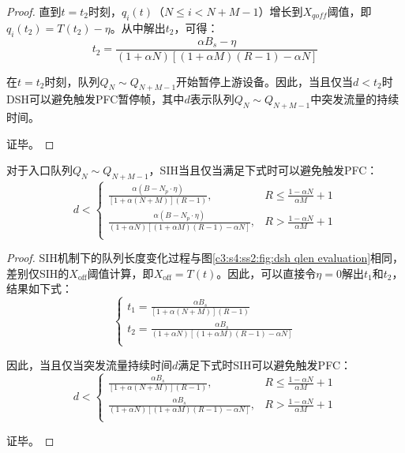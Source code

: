 \begin{proof}
  直到$t=t_2$时刻，$q_i(t)$（$N \leqslant i < N + M - 1$）增长到$X_{\mathit{qoff}}$阈值，即$q_i(t_2)=T(t_2)-\eta$。从中解出$t_2$，可得：
  \begin{equation}
    t_2=\frac{\alpha B_s - \eta}{(1+\alpha N)[(1+\alpha M)(R-1)-\alpha N]}
  \end{equation}

  在$t=t_2$时刻，队列$Q_N \sim Q_{N+M-1}$开始暂停上游设备。因此，当且仅当$d<t_2$时DSH可以避免触发PFC暂停帧，其中$d$表示队列$Q_N \sim Q_{N+M-1}$中突发流量的持续时间。

  证毕。
\end{proof}


\begin{theorem}
  对于入口队列$Q_N \sim Q_{N+M-1}$，SIH当且仅当满足下式时可以避免触发PFC：
  \label{thm:c3:burst absorption for SIH}  
  \begin{equation}
    d < 
    \begin{cases}
      \frac{\alpha(B-N_p\cdot \eta)}{[1+\alpha(N+M)](R-1)}, & R\leqslant\frac{1-\alpha N}{\alpha M}+1 \\
      \frac{\alpha(B-N_p\cdot \eta)}{(1+\alpha N)[(1+\alpha M)(R-1)-\alpha N]}, & R>\frac{1-\alpha N}{\alpha M}+1 \\
    \end{cases}
    \label{eqn:c3:sih burst obsorption}
  \end{equation}
  
\end{theorem}

\begin{proof}
  SIH机制下的队列长度变化过程与图\ref{c3:s4:ss2:fig:dsh qlen evaluation}相同，差别仅SIH的$X_{\text{off}}$阈值计算，即$X_{\text{off}} = T(t)$。因此，可以直接令$\eta = 0$解出$t_1$和$t_2$，结果如下式：
  \begin{equation}
    \begin{cases}
      t_1=\frac{\alpha B_s}{[1+\alpha (N+M)](R-1)} \\
      t_2=\frac{\alpha B_s}{(1+\alpha N)[(1+\alpha M)(R-1)-\alpha N]} \\
    \end{cases}  
    \label{c3:s4:ss2:eqn:t1 and t2 in sih}
  \end{equation}

  因此，当且仅当突发流量持续时间$d$满足下式时SIH可以避免触发PFC：
  \begin{equation}
    d < 
    \begin{cases}
      \frac{\alpha B_s}{[1+\alpha(N+M)](R-1)}, & R\leqslant\frac{1-\alpha N}{\alpha M}+1 \\
      \frac{\alpha B_s}{(1+\alpha N)[(1+\alpha M)(R-1)-\alpha N]}, & R>\frac{1-\alpha N}{\alpha M}+1 \\
    \end{cases}
    \label{eqn:c3:sih:port pause threshold}
  \end{equation}

  证毕。
\end{proof}

